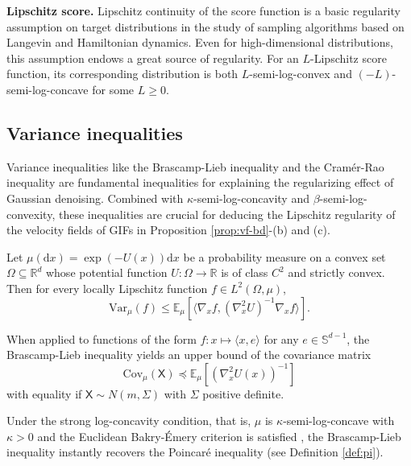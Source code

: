 \documentclass[twoside,11pt]{article}
\def\sR{{\mathbb{R}}}
\newcommand{\E}{\mathbb{E}}
\newcommand{\Var}{\mathrm{Var}}
\newcommand{\Cov}{\mathrm{Cov}}
\newcommand{\diff}{\mathrm{d}}
\numberwithin{equation}{section}
\begin{document}
\textbf{Lipschitz score.}
Lipschitz continuity of the score function is a basic regularity assumption on target distributions in the study of sampling algorithms based on Langevin and Hamiltonian dynamics. Even for high-dimensional distributions, this assumption endows a great source of regularity.
For an $L$-Lipschitz score function, its corresponding distribution is both $L$-semi-log-convex and $(-L)$-semi-log-concave for some $L \ge 0.$


\subsection{Variance inequalities}
Variance inequalities like the Brascamp-Lieb inequality and the Cram{\'e}r-Rao inequality are fundamental inequalities for explaining the regularizing effect of Gaussian denoising. Combined with $\kappa$-semi-log-concavity and $\beta$-semi-log-convexity, these inequalities are crucial for deducing the Lipschitz regularity of the velocity fields of GIFs in
Proposition \ref{prop:vf-bd}-(b) and (c).

\begin{lemma} 
    \label{lm:bli}
    Let $\mu(\diff x) = \exp(-U(x)) \diff x$ be a probability measure on a convex set $\Omega \subseteq \sR^d$ whose potential function $U: \Omega \to \sR$ is of class $C^2$ and strictly convex.
    Then for every locally Lipschitz function $f \in L^2(\Omega, \mu)$,
    \begin{equation}
       \label{eq:bli-gene}
       \Var_{\mu} (f) \le \E_{\mu} \left[ \langle \nabla_x f, (\nabla^2_x U)^{-1} \nabla_x f \rangle \right].
    \end{equation}
\end{lemma}

When applied to functions of the form $f: x \mapsto \langle x, e \rangle$ for any $e \in \mathbb{S}^{d-1}$, the Brascamp-Lieb inequality yields an upper bound of the covariance matrix
 \begin{equation}
        \label{eq:bli-cov}
        \Cov_{\mu} (\mathsf{X}) \preceq \E_{\mu} \left[ (\nabla^2_x U(x))^{-1} \right]
 \end{equation}
 with equality if $\mathsf{X} \sim N(m, \Sigma)$ with $\Sigma$ positive deﬁnite.

 Under the strong log-concavity condition, that is,  $\mu$ is $\kappa$-semi-log-concave with $\kappa > 0$ and the Euclidean Bakry-{\'E}mery criterion is satisfied \citep{bakry1985diffusions}, the Brascamp-Lieb inequality instantly recovers the Poincar{\'e} inequality (see Definition \ref{def:pi}).
\end{document}
